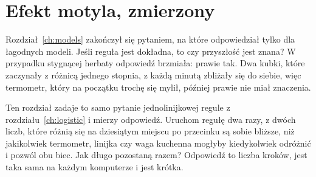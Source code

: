 
\chapter{Efekt motyla, zmierzony}
\label{ch:butterfly}

\noindent
Rozdział~\ref{ch:models} zakończył się pytaniem, na które odpowiedział tylko
dla łagodnych modeli. Jeśli reguła jest dokładna, to czy przyszłość jest
znana? W przypadku stygnącej herbaty odpowiedź brzmiała: prawie tak. Dwa
kubki, które zaczynały z różnicą jednego stopnia, z każdą minutą zbliżały
się do siebie, więc termometr, który na początku trochę się mylił, później
prawie nie miał znaczenia.

Ten rozdział zadaje to samo pytanie jednolinijkowej regule z
rozdziału~\ref{ch:logistic} i mierzy odpowiedź. Uruchom regułę dwa razy, z
dwóch liczb, które różnią się na dziesiątym miejscu po przecinku \dash{} są
sobie bliższe, niż jakikolwiek termometr, linijka czy waga kuchenna
mogłyby kiedykolwiek odróżnić \dash{} i pozwól obu biec. Jak długo pozostaną
razem? Odpowiedź to liczba kroków, jest taka sama na każdym komputerze i
jest krótka.

\begin{outcomes}
\end{outcomes}

